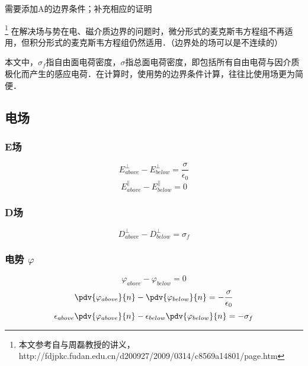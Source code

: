 
\begin{issues}
\issueTODO 需要添加A的边界条件；补充相应的证明
\end{issues}

\footnote{本文参考自\cite{GriffE}与周磊教授的讲义，http://fdjpkc.fudan.edu.cn/d200927/2009/0314/c8569a14801/page.htm}
在解决场与势在电、磁介质边界的问题时，微分形式的麦克斯韦方程组不再适用，但积分形式的麦克斯韦方程组仍然适用．（边界处的场可以是不连续的）

本文中，$\sigma_f$指自由面电荷密度，$\sigma$指总面电荷密度，即包括所有自由电荷与因介质极化而产生的感应电荷．在计算时，使用势的边界条件计算，往往比使用场更为简便．

\subsection{电场}

\subsubsection{E场}
\begin{equation}
E^\perp_{above} - E^\perp_{below} = \frac{\sigma}{\epsilon_0}
\end{equation}
\begin{equation}
E^\parallel_{above} - E^\parallel_{below} = 0
\end{equation}

\subsubsection{D场}
\begin{equation}
D^\perp_{above} - D^\perp_{below} = \sigma_f
\end{equation}

\subsubsection{电势 $\varphi$}
\begin{equation}
\varphi_{above}-\varphi_{below}=0
\end{equation}
\begin{equation}
\pdv{\varphi_{above}}{n} - \pdv{\varphi_{below}}{n}  = -\frac{\sigma}{\epsilon_0}
\end{equation}
\begin{equation}
\epsilon_{above}\pdv{\varphi_{above}}{n} - \epsilon_{below}\pdv{\varphi_{below}}{n}  = -\sigma_f
\end{equation}

